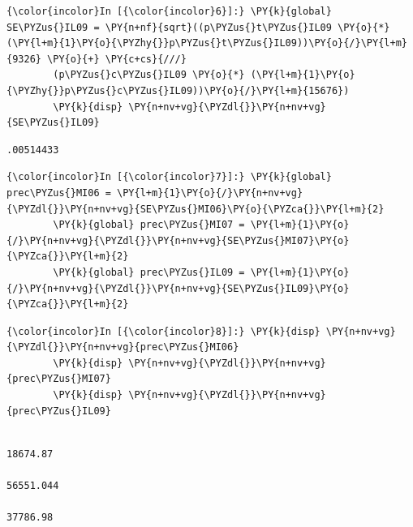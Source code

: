 \documentclass[11pt,notitlepage]{article}\usepackage[]{graphicx}\usepackage[]{color}
\makeatletter
\newenvironment{kframe}{%
 \def\at@end@of@kframe{}%
 \ifinner\ifhmode%
  \def\at@end@of@kframe{\end{minipage}}%
  \begin{minipage}{\columnwidth}%
 \fi\fi%
 \def\FrameCommand##1{\hskip\@totalleftmargin \hskip-\fboxsep
 \colorbox{shadecolor}{##1}\hskip-\fboxsep
     \hskip-\linewidth \hskip-\@totalleftmargin \hskip\columnwidth}%
 \MakeFramed {\advance\hsize-\width
   \@totalleftmargin\z@ \linewidth\hsize
   \@setminipage}}%
 {\par\unskip\endMakeFramed%
 \at@end@of@kframe}
\newenvironment{knitrout}{}{} %
\makeatother
\begin{document}
\begin{enumerate}[a)]
\begin{knitrout}
\begin{kframe}
\begin{Verbatim}[commandchars=\\\{\}]
    \end{Verbatim}

    \begin{Verbatim}[commandchars=\\\{\}]
{\color{incolor}In [{\color{incolor}6}]:} \PY{k}{global} SE\PYZus{}IL09 = \PY{n+nf}{sqrt}((p\PYZus{}t\PYZus{}IL09 \PY{o}{*} (\PY{l+m}{1}\PY{o}{\PYZhy{}}p\PYZus{}t\PYZus{}IL09))\PY{o}{/}\PY{l+m}{9326} \PY{o}{+} \PY{c+cs}{///}
        (p\PYZus{}c\PYZus{}IL09 \PY{o}{*} (\PY{l+m}{1}\PY{o}{\PYZhy{}}p\PYZus{}c\PYZus{}IL09))\PY{o}{/}\PY{l+m}{15676})
        \PY{k}{disp} \PY{n+nv+vg}{\PYZdl{}}\PY{n+nv+vg}{SE\PYZus{}IL09}
\end{Verbatim}

    \begin{Verbatim}[commandchars=\\\{\}]
.00514433

    \end{Verbatim}

    \begin{Verbatim}[commandchars=\\\{\}]
{\color{incolor}In [{\color{incolor}7}]:} \PY{k}{global} prec\PYZus{}MI06 = \PY{l+m}{1}\PY{o}{/}\PY{n+nv+vg}{\PYZdl{}}\PY{n+nv+vg}{SE\PYZus{}MI06}\PY{o}{\PYZca{}}\PY{l+m}{2}
        \PY{k}{global} prec\PYZus{}MI07 = \PY{l+m}{1}\PY{o}{/}\PY{n+nv+vg}{\PYZdl{}}\PY{n+nv+vg}{SE\PYZus{}MI07}\PY{o}{\PYZca{}}\PY{l+m}{2}
        \PY{k}{global} prec\PYZus{}IL09 = \PY{l+m}{1}\PY{o}{/}\PY{n+nv+vg}{\PYZdl{}}\PY{n+nv+vg}{SE\PYZus{}IL09}\PY{o}{\PYZca{}}\PY{l+m}{2}
\end{Verbatim}

    \begin{Verbatim}[commandchars=\\\{\}]
{\color{incolor}In [{\color{incolor}8}]:} \PY{k}{disp} \PY{n+nv+vg}{\PYZdl{}}\PY{n+nv+vg}{prec\PYZus{}MI06}
        \PY{k}{disp} \PY{n+nv+vg}{\PYZdl{}}\PY{n+nv+vg}{prec\PYZus{}MI07}
        \PY{k}{disp} \PY{n+nv+vg}{\PYZdl{}}\PY{n+nv+vg}{prec\PYZus{}IL09}
\end{Verbatim}

    \begin{Verbatim}[commandchars=\\\{\}]

18674.87

56551.044

37786.98

    \end{Verbatim}

\end{kframe}
\end{knitrout}



\end{enumerate}
\end{document}
